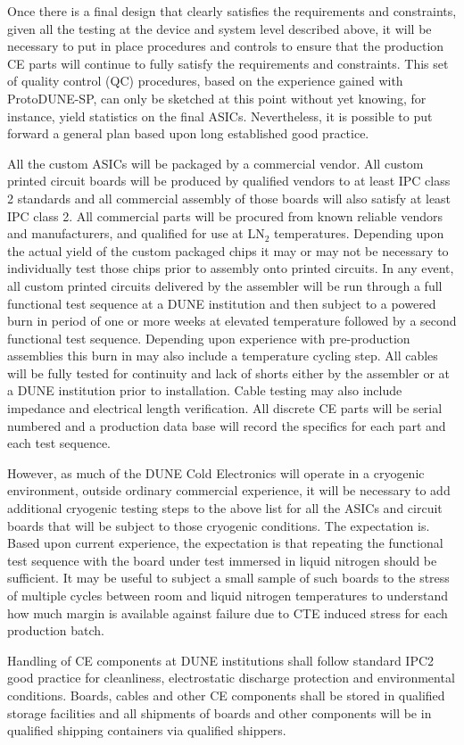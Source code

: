 
Once there is a final design that clearly satisfies the requirements and constraints, given all the testing at the device and system level described above, it will be necessary to put in place procedures and controls to ensure that the production CE parts will continue to fully satisfy the requirements and constraints. This set of quality control (QC) procedures, based on the experience gained with ProtoDUNE-SP, can only be sketched at this point without yet knowing, for instance, yield statistics on the final ASICs. Nevertheless, it is possible to put forward a general plan based upon long established good practice.

All the custom ASICs will be packaged by a commercial vendor. All custom printed circuit boards will be produced by qualified vendors to at least IPC class 2 standards and all commercial assembly of those boards will also satisfy at least IPC class 2. All commercial parts will be procured from known reliable vendors and manufacturers, and qualified for use at LN$_2$ temperatures. Depending upon the actual yield of the custom packaged chips it may or may not be necessary to individually test those chips prior to assembly onto printed circuits. In any event, all custom printed circuits delivered by the assembler will be run through a full functional test sequence at a DUNE institution and then subject to a powered burn in period of one or more weeks at elevated temperature followed by a second functional test sequence. Depending upon experience with pre-production assemblies this burn in may also include a temperature cycling step. All cables will be fully tested for continuity and lack of shorts either by the assembler or at a DUNE institution prior to installation. Cable testing may also include impedance and electrical length verification. All discrete CE parts will be serial numbered and a production data base will record the specifics for each part and each test sequence.

However, as much of the DUNE Cold Electronics will operate in a cryogenic environment, outside ordinary commercial experience, it will be necessary to add additional cryogenic testing steps to the above list for all the ASICs and circuit boards that will be subject to those cryogenic conditions. The expectation is. Based upon current experience, the expectation is that repeating the functional test sequence with the board under test immersed in liquid nitrogen should be sufficient. It may be useful to subject a small sample of such boards to the stress of multiple cycles between room and liquid nitrogen temperatures to understand how much margin is available against failure due to CTE induced stress for each production batch.

Handling of CE components at DUNE institutions shall follow standard IPC2 good practice for cleanliness, electrostatic discharge protection and environmental conditions. Boards, cables and other CE components shall be stored in qualified storage facilities and all shipments of boards and other components will be in qualified shipping containers via qualified shippers.
